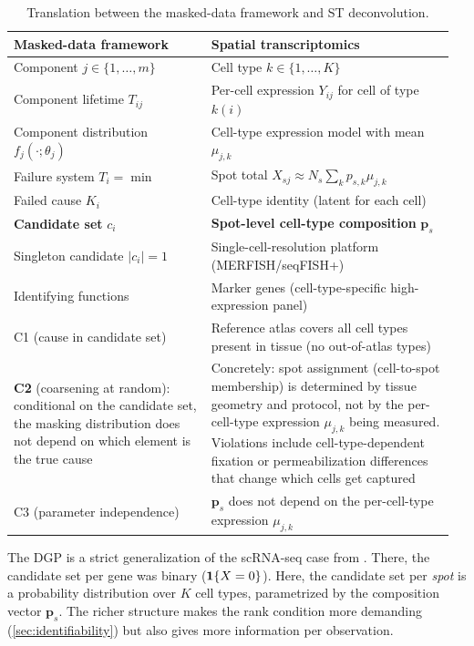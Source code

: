 \begin{table}[ht]
\centering
\small
\begin{tabular}{@{}p{0.43\linewidth} p{0.53\linewidth}@{}}
\toprule
\textbf{Masked-data framework} & \textbf{Spatial transcriptomics} \\
\midrule
Component $j \in \{1,\ldots,m\}$ & Cell type $k \in \{1,\ldots,K\}$ \\
Component lifetime $T_{ij}$ & Per-cell expression $Y_{ij}$ for cell of type $k(i)$ \\
Component distribution $f_j(\cdot;\theta_j)$ & Cell-type expression model with mean $\mu_{j,k}$ \\
Failure system $T_i = \min$ & Spot total $X_{sj} \approx N_s \sum_k p_{s,k}\mu_{j,k}$ \\
Failed cause $K_i$ & Cell-type identity (latent for each cell) \\
\textbf{Candidate set} $c_i$ & \textbf{Spot-level cell-type composition} $\bm{p}_s$ \\
Singleton candidate $|c_i|=1$ & Single-cell-resolution platform (MERFISH/seqFISH+) \\
Identifying functions & Marker genes (cell-type-specific high-expression panel) \\
C1 (cause in candidate set) & Reference atlas covers all cell types present in tissue (no out-of-atlas types) \\
\textbf{C2} (coarsening at random): conditional on the candidate set, the masking distribution does not depend on which element is the true cause &
  Concretely: spot assignment (cell-to-spot membership) is determined by tissue geometry and protocol, not by the per-cell-type expression $\mu_{j,k}$ being measured. Violations include cell-type-dependent fixation or permeabilization differences that change which cells get captured \\
C3 (parameter independence) & $\bm{p}_s$ does not depend on the per-cell-type expression $\mu_{j,k}$ \\
\bottomrule
\end{tabular}
\caption{Translation between the masked-data framework
\citep{towell2026masked} and ST deconvolution.}
\label{tab:translation}
\end{table}

The DGP is a strict generalization of the scRNA-seq case from
\citet{towell2026scrnacoarsening}. There, the candidate set per
gene was binary ($\mathbf{1}\{X = 0\}$). Here, the candidate set per
\emph{spot} is a probability distribution over $K$ cell types,
parametrized by the composition vector $\bm{p}_s$. The richer
structure makes the rank condition more demanding (\cref{sec:identifiability})
but also gives more information per observation.

